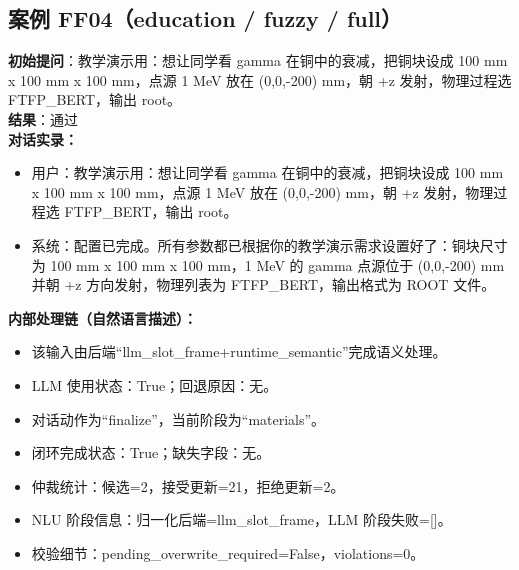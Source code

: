 \documentclass[11pt]{ctexart}
\begin{document}
\subsection{案例 FF04（education / fuzzy / full）}
\textbf{初始提问}：教学演示用：想让同学看 gamma 在铜中的衰减，把铜块设成 100 mm x 100 mm x 100 mm，点源 1 MeV 放在 (0,0,-200) mm，朝 +z 发射，物理过程选 FTFP\_BERT，输出 root。\\
\textbf{结果}：通过\\
\textbf{对话实录：}
\begin{itemize}
\item 用户：教学演示用：想让同学看 gamma 在铜中的衰减，把铜块设成 100 mm x 100 mm x 100 mm，点源 1 MeV 放在 (0,0,-200) mm，朝 +z 发射，物理过程选 FTFP\_BERT，输出 root。
\item 系统：配置已完成。所有参数都已根据你的教学演示需求设置好了：铜块尺寸为 100 mm x 100 mm x 100 mm，1 MeV 的 gamma 点源位于 (0,0,-200) mm 并朝 +z 方向发射，物理列表为 FTFP\_BERT，输出格式为 ROOT 文件。
\end{itemize}
\textbf{内部处理链（自然语言描述）：}
\begin{itemize}
\item 该输入由后端“llm\_slot\_frame+runtime\_semantic”完成语义处理。
\item LLM 使用状态：True；回退原因：无。
\item 对话动作为“finalize”，当前阶段为“materials”。
\item 闭环完成状态：True；缺失字段：无。
\item 仲裁统计：候选=2，接受更新=21，拒绝更新=2。
\item NLU 阶段信息：归一化后端=llm\_slot\_frame，LLM 阶段失败=[]。
\item 校验细节：pending\_overwrite\_required=False，violations=0。
\end{itemize}
\end{document}
